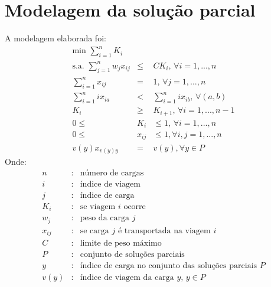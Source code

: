 \documentclass{article}
\begin{document}
\section{Modelagem da solução parcial} \label{modelagem}
A modelagem elaborada foi:
\begin{eqnarray}
    \mbox{min } \sum_{i=1}^n K_i\\
    \mbox{s.a. }\sum_{j=1}^n w_j x_{ij} &\leq& C K_i \mbox{, } \forall i = 1, ..., n\\
    \sum_{i=1}^n x_{ij} &=& 1 \mbox{, } \forall j = 1, ..., n\\
    \sum_{i=1}^n i x_{ia} &<& \sum_{i=1}^n ix_{ib} \mbox{, } \forall (a, b)\\
    K_i &\geq& K_{i+1} \mbox{, } \forall i = 1, ..., n-1\\
    0 \leq &K_i& \leq 1 \mbox{, } \forall i = 1, ..., n\\
    0 \leq &x_{ij}& \leq 1, \forall i, j = 1, ..., n\\
    v(y)x_{v(y)y} &=& v(y), \forall y \in P
\end{eqnarray}
Onde:
\begin{eqnarray*}
    n &:& \mbox{número de cargas}\\
    i &:& \mbox{índice de viagem}\\
    j &:& \mbox{índice de carga}\\
    K_i &:& \mbox{se viagem } i \mbox{ ocorre}\\
    w_j &:& \mbox{peso da carga } j\\
    x_{ij} &:& \mbox{se carga } j \mbox{ é transportada na viagem } i\\
    C &:& \mbox{limite de peso máximo}\\
    P &:& \mbox{conjunto de soluções parciais}\\
    y &:& \mbox{índice de carga no conjunto das soluções parciais }P\\
    v(y) &:& \mbox{índice de viagem da carga }y \mbox{, } y \in P
\end{eqnarray*}

\newpage
\end{document}
